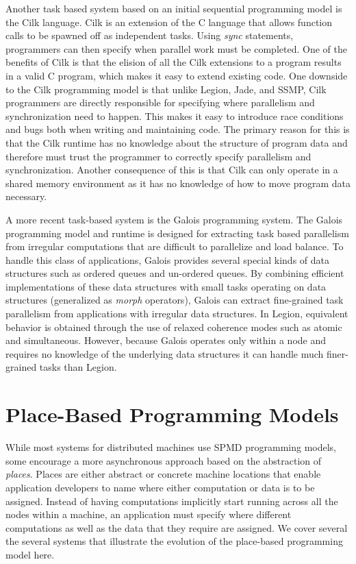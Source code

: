 Another task based system based on an initial
sequential programming model is the Cilk
language\cite{Cilk98}. Cilk is an extension of
the C language that allows function calls to
be spawned off as independent tasks. Using 
{\em sync} statements, programmers can then
specify when parallel work must be completed.
One of the benefits of Cilk is that the elision
of all the Cilk extensions to a program results
in a valid C program, which makes it easy to
extend existing code. One downside to the Cilk
programming model is that unlike Legion, Jade,
and SSMP, Cilk programmers are directly responsible
for specifying where parallelism and synchronization
need to happen. This makes it easy to introduce
race conditions and bugs both when writing and
maintaining code. The primary reason for this
is that the Cilk runtime has no knowledge about
the structure of program data and therefore
must trust the programmer to correctly specify
parallelism and synchronization. Another consequence
of this is that Cilk can only operate in a
shared memory environment as it has no knowledge
of how to move program data necessary.

A more recent task-based system is the Galois
programming system\cite{Galois11}. The Galois 
programming model and runtime is designed for 
extracting task based parallelism from irregular 
computations that are difficult to parallelize 
and load balance. To handle this class of
applications, Galois provides several special
kinds of data structures such as ordered
queues and un-ordered queues. By combining
efficient implementations of these data structures
with small tasks operating on data structures
(generalized as {\em morph} operators), Galois
can extract fine-grained task parallelism
from applications with irregular data structures.
In Legion, equivalent behavior is obtained through
the use of relaxed coherence modes such as
atomic and simultaneous. However, because
Galois operates only within a node and requires
no knowledge of the underlying data structures
it can handle much finer-grained tasks than
Legion.

\section{Place-Based Programming Models}
\label{sec:places}

While most systems for distributed machines
use SPMD programming models, some encourage
a more asynchronous approach based on the
abstraction of {\em places}. Places are
either abstract or concrete machine locations 
that enable application developers to name 
where either computation or data is to be
assigned. Instead of having computations
implicitly start running across all the nodes
within a machine, an application must specify
where different computations as well as the
data that they require are assigned. We cover
several the several systems that illustrate
the evolution of the place-based programming
model here.

